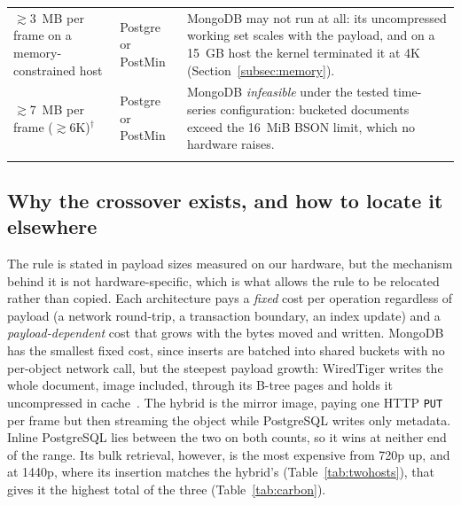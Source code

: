 \documentclass[pdflatex,sn-basic]{sn-jnl}%
\begin{document}
\begin{table}[htbp]
\begin{tabular}{@{}p{}p{}p{}@{}}
$\gtrsim$3~MB per frame on a memory-constrained host & Postgre or PostMin & MongoDB may not run at all: its uncompressed working set scales with the payload, and on a 15~GB host the kernel terminated it at 4K (Section~\ref{subsec:memory}). \\
$\gtrsim$7~MB per frame ($\gtrsim$6K)$^\dagger$ & Postgre or PostMin & MongoDB \emph{infeasible} under the tested time-series configuration: bucketed documents exceed the 16~MiB BSON limit, which no hardware raises. \\
\botrule
\end{tabular}
\end{table}

\subsection{Why the crossover exists, and how to locate it elsewhere}\label{subsec:model}
{\color{markup}The rule is stated in payload sizes measured on our hardware, but the mechanism behind it is not hardware-specific, which is what allows the rule to be relocated rather than copied.} {\color{markup}Each architecture pays a \emph{fixed} cost per operation regardless of payload (a network round-trip, a transaction boundary, an index update) and a \emph{payload-dependent} cost that grows with the bytes moved and written.} {\color{markup}MongoDB has the smallest fixed cost, since inserts are batched into shared buckets with no per-object network call, but the steepest payload growth: WiredTiger writes the whole document, image included, through its B-tree pages and holds it uncompressed in cache~\citep{wiredtiger_btree_architecture}.} {\color{markup}The hybrid is the mirror image, paying one HTTP \texttt{PUT} per frame but then streaming the object while PostgreSQL writes only metadata.} {\color{markup}Inline PostgreSQL lies between the two on both counts, so it wins at neither end of the range.} {\color{markup}Its bulk retrieval, however, is the most expensive from 720p up, and at 1440p, where its insertion matches the hybrid's (Table~\ref{tab:twohosts}), that gives it the highest total of the three (Table~\ref{tab:carbon}).}
\end{document}
